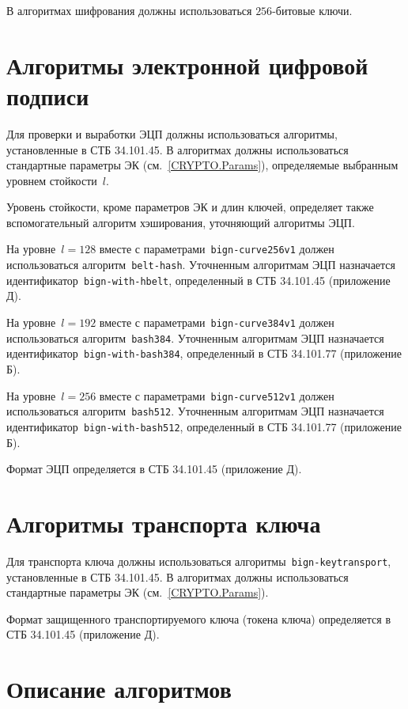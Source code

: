 В алгоритмах шифрования должны использоваться $256$-битовые ключи.

\section{Алгоритмы электронной цифровой подписи}\label{CRYPTO.Sign}

Для проверки и выработки ЭЦП должны использоваться алгоритмы,
установленные в СТБ 34.101.45. 
%
В алгоритмах должны использоваться стандартные параметры ЭК 
(см.~\ref{CRYPTO.Params}), определяемые выбранным уровнем стойкости~$l$.

Уровень стойкости, кроме параметров ЭК и длин ключей,
определяет также вспомогательный алгоритм хэширования,
уточняющий алгоритмы ЭЦП.

На уровне~$l=128$ вместе с параметрами~\texttt{bign-curve256v1}
должен использоваться алгоритм~\texttt{belt-hash}. 
Уточненным алгоритмам ЭЦП назначается идентификатор~\texttt{bign-with-hbelt}, 
определенный в СТБ 34.101.45 (приложение Д). 

На уровне~$l=192$ вместе с параметрами~\texttt{bign-curve384v1}
должен использоваться алгоритм~\texttt{bash384}. 
Уточненным алгоритмам ЭЦП назначается 
идентификатор~\texttt{bign-with-bash384},  
определенный в СТБ 34.101.77 (приложение Б).

На уровне~$l=256$ вместе с параметрами~\texttt{bign-curve512v1}
должен использоваться алгоритм~\texttt{bash512}. 
Уточненным алгоритмам ЭЦП назначается 
идентификатор~\texttt{bign-with-bash512},  
определенный в СТБ 34.101.77 (приложение Б).

Формат ЭЦП определяется в СТБ 34.101.45 (приложение Д).

\section{Алгоритмы транспорта ключа}\label{CRYPTO.Transport}

Для транспорта ключа должны использоваться 
алгоритмы~\texttt{bign-keytransport}, установленные в СТБ 34.101.45. 
%
В алгоритмах должны использоваться стандартные параметры 
ЭК (см.~\ref{CRYPTO.Params}). 

Формат защищенного транспортируемого ключа (токена ключа)
определяется в СТБ 34.101.45 (приложение Д). 

\section{Описание алгоритмов}\label{CRYPTO.AlgId}

